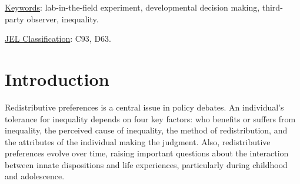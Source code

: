 \documentclass[11pt]{article}
\begin{document}
 \par \medskip

\begin{abstract}
\noindent  
We recruit 2,253 children and teenagers aged 6 to 18 in Spain to examine how young impartial observers balance merit and fairness when allocating rewards between a winner and a loser of a competition task. Using a third-party observer game, we manipulate how winners are determined---through talent, effort, or luck---and compare two reallocation methods: redistribution of tokens from winner to loser versus adding tokens to both. Participants allocate less to the loser when equalization requires taking tokens from the winner. Under addition, the estimated age profile rises through early adolescence and then tapers off, especially for final allocations; under redistribution, the corresponding profile is comparatively flat.
Pooled estimates also indicate lower transfers to the loser when the winner is selected by talent rather than luck, while estimates for effort relative to luck are small or imprecise. Finally, allocation decisions are related to gender, personality traits, and the observer's capacity for empathy, with male participants exhibiting more meritocratic allocation patterns.
Overall, our results show that the development of redistributive preferences is sensitive to the institutional mechanism through which redistribution is implemented.
\end{abstract}   

\noindent \underline{Keywords}: lab-in-the-field experiment, developmental decision making, third-party observer, inequality.

\noindent \underline{JEL Classification}: C93, D63.



\newpage


\setcounter{page}{1} \renewcommand{\thefootnote}{\arabic{footnote}} %
\setcounter{footnote}{0}

 \section{Introduction}
Redistributive preferences is a central issue in policy debates.
An individual's tolerance for inequality depends on four key factors: who benefits or suffers from inequality, the perceived cause of inequality, the method of redistribution, and the attributes of the individual making the judgment. Also, redistributive preferences evolve over time, raising important questions about the interaction between innate dispositions and life experiences, particularly during childhood and adolescence.
\end{document}
